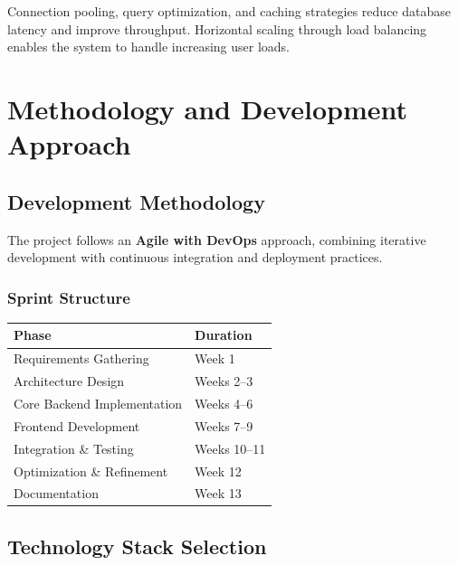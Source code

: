 \documentclass[12pt,a4paper]{report}
\newenvironment{reqbox}{%
  \begin{tcolorbox}[colback=lightgray,colframe=rulecol,
    leftrule=3pt,rightrule=0.4pt,toprule=0.4pt,bottomrule=0.4pt,
    arc=2pt,boxsep=2pt,left=4pt,right=4pt,top=3pt,bottom=3pt,breakable]
}{\end{tcolorbox}}
\begin{document}
Connection pooling, query optimization, and caching strategies reduce database latency and improve throughput. Horizontal scaling through load balancing enables the system to handle increasing user loads.

\cleardoublepage


\chapter{Methodology and Development Approach}

\section{Development Methodology}

The project follows an \textbf{Agile with DevOps} approach, combining iterative development with continuous integration and deployment practices.

\subsection{Sprint Structure}

\begin{reqbox}
  \begin{tabular}{l|p{7cm}}
    \textbf{Phase} & \textbf{Duration} \\
    \hline
    Requirements Gathering & Week 1 \\
    \hline
    Architecture Design & Weeks 2--3 \\
    \hline
    Core Backend Implementation & Weeks 4--6 \\
    \hline
    Frontend Development & Weeks 7--9 \\
    \hline
    Integration \& Testing & Weeks 10--11 \\
    \hline
    Optimization \& Refinement & Week 12 \\
    \hline
    Documentation & Week 13 \\
    \hline
  \end{tabular}
\end{reqbox}

\section{Technology Stack Selection}
\end{document}
